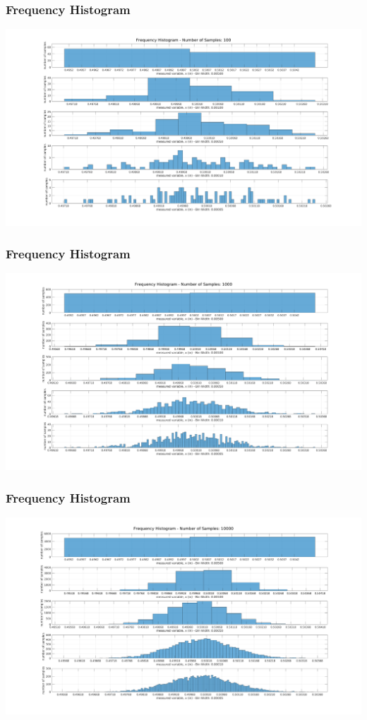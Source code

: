 \documentclass[fleqn]{beamer} %
\newcommand{\sectiontitleIII}{Frequency Histogram}
\begin{document}
	\begin{frame} \small
		\frametitle{\sectiontitleIII}    

	\includegraphics[scale=.25]{topic2_histogram_fig2}


	\end{frame}
	
	\begin{frame} \small
		\frametitle{\sectiontitleIII}    

	\includegraphics[scale=.25]{topic2_histogram_fig3}


	\end{frame}
	
	\begin{frame} \small
		\frametitle{\sectiontitleIII}    

	\includegraphics[scale=.25]{topic2_histogram_fig4}


	\end{frame}
\end{document}
